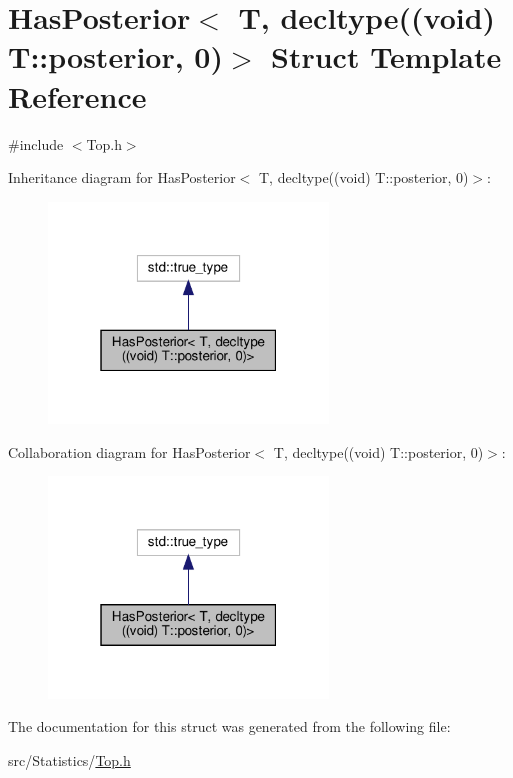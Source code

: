 \hypertarget{struct_has_posterior_3_01_t_00_01decltype_07_07void_08_01_t_1_1posterior_00_010_08_4}{}\section{Has\+Posterior$<$ T, decltype((void) T\+:\+:posterior, 0)$>$ Struct Template Reference}
\label{struct_has_posterior_3_01_t_00_01decltype_07_07void_08_01_t_1_1posterior_00_010_08_4}


{\ttfamily \#include $<$Top.\+h$>$}



Inheritance diagram for Has\+Posterior$<$ T, decltype((void) T\+:\+:posterior, 0)$>$\+:\nopagebreak
\begin{figure}[H]
\begin{center}
\leavevmode
\includegraphics[width=211pt]{struct_has_posterior_3_01_t_00_01decltype_07_07void_08_01_t_1_1posterior_00_010_08_4__inherit__graph}
\end{center}
\end{figure}


Collaboration diagram for Has\+Posterior$<$ T, decltype((void) T\+:\+:posterior, 0)$>$\+:\nopagebreak
\begin{figure}[H]
\begin{center}
\leavevmode
\includegraphics[width=211pt]{struct_has_posterior_3_01_t_00_01decltype_07_07void_08_01_t_1_1posterior_00_010_08_4__coll__graph}
\end{center}
\end{figure}


The documentation for this struct was generated from the following file\+:\begin{DoxyCompactItemize}
\item 
src/\+Statistics/\hyperlink{_top_8h}{Top.\+h}\end{DoxyCompactItemize}
